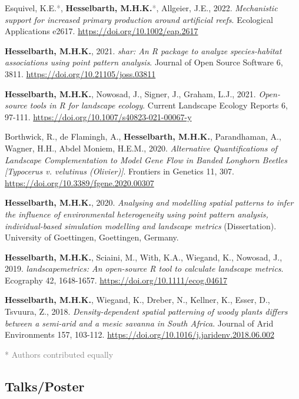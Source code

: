 \documentclass[12pt, hidelinks]{report}
\begin{document}
\begin{hangparas}{7.5mm}{1}

Esquivel, K.E.\textcolor{grey}{*}, \textbf{Hesselbarth, M.H.K.}\textcolor{grey}{*}, Allgeier, J.E., 2022. \textit{Mechanistic support for increased primary production around artificial reefs}. Ecological Applications e2617. \url{https://doi.org/10.1002/eap.2617}

\textbf{Hesselbarth, M.H.K.}, 2021. \textit{shar: An R package to analyze species-habitat associations using point pattern analysis}. Journal of Open Source Software 6, 3811. \url{https://doi.org/10.21105/joss.03811}

\textbf{Hesselbarth, M.H.K.}, Nowosad, J., Signer, J., Graham, L.J., 2021. \textit{Open-source tools in R for landscape ecology}. Current Landscape Ecology Reports 6, 97-111. \url{https://doi.org/10.1007/s40823-021-00067-y}

Borthwick, R., de Flamingh, A., \textbf{Hesselbarth, M.H.K.}, Parandhaman, A., Wagner, H.H., Abdel Moniem, H.E.M., 2020. \textit{Alternative Quantifications of Landscape Complementation to Model Gene Flow in Banded Longhorn Beetles [Typocerus v. velutinus (Olivier)]}. Frontiers in Genetics 11, 307. \url{https://doi.org/10.3389/fgene.2020.00307}

\textbf{Hesselbarth, M.H.K.}, 2020. \textit{Analysing and modelling spatial patterns to infer the influence of environmental heterogeneity using point pattern analysis, individual-based simulation modelling and landscape metrics} (Dissertation). University of Goettingen, Goettingen, Germany.

\textbf{Hesselbarth, M.H.K.}, Sciaini, M., With, K.A., Wiegand, K., Nowosad, J., 2019. \textit{landscapemetrics: An open-source R tool to calculate landscape metrics}. Ecography 42, 1648-1657. \url{https://doi.org/10.1111/ecog.04617}

\textbf{Hesselbarth, M.H.K.}, Wiegand, K., Dreber, N., Kellner, K., Esser, D., Tsvuura, Z., 2018. \textit{Density-dependent spatial patterning of woody plants differs between a semi-arid and a mesic savanna in South Africa}. Journal of Arid Environments 157, 103-112. \url{https://doi.org/10.1016/j.jaridenv.2018.06.002}

\end{hangparas}

\textcolor{grey}{* Authors contributed equally}

\subsection*{Talks/Poster}
\end{document}
